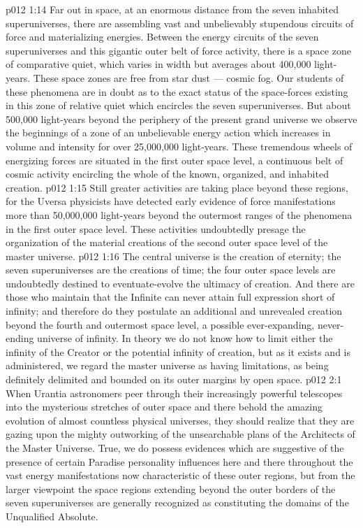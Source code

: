 \vs p012 1:14  Far out in space, at an enormous distance from the seven inhabited superuniverses, there are assembling vast and unbelievably stupendous circuits of force and materializing energies. Between the energy circuits of the seven superuniverses and this gigantic outer belt of force activity, there is a space zone of comparative quiet, which varies in width but averages about 400,000 light\hyp{}years. These space zones are free from star dust --- cosmic fog. Our students of these phenomena are in doubt as to the exact status of the space\hyp{}forces existing in this zone of relative quiet which encircles the seven superuniverses. But about 500,000 light\hyp{}years beyond the periphery of the present grand universe we observe the beginnings of a zone of an unbelievable energy action which increases in volume and intensity for over 25,000,000 light\hyp{}years. These tremendous wheels of energizing forces are situated in the first outer space level, a continuous belt of cosmic activity encircling the whole of the known, organized, and inhabited creation.
\vs p012 1:15 Still greater activities are taking place beyond these regions, for the Uversa physicists have detected early evidence of force manifestations more than 50,000,000 light\hyp{}years beyond the outermost ranges of the phenomena in the first outer space level. These activities undoubtedly presage the organization of the material creations of the second outer space level of the master universe.
\vs p012 1:16 The central universe is the creation of eternity; the seven superuniverses are the creations of time; the four outer space levels are undoubtedly destined to eventuate\hyp{}evolve the ultimacy of creation. And there are those who maintain that the Infinite can never attain full expression short of infinity; and therefore do they postulate an additional and unrevealed creation beyond the fourth and outermost space level, a possible ever\hyp{}expanding, never\hyp{}ending universe of infinity. In theory we do not know how to limit either the infinity of the Creator or the potential infinity of creation, but as it exists and is administered, we regard the master universe as having limitations, as being definitely delimited and bounded on its outer margins by open space.
\vs p012 2:1 When Urantia astronomers peer through their increasingly powerful telescopes into the mysterious stretches of outer space and there behold the amazing evolution of almost countless physical universes, they should realize that they are gazing upon the mighty outworking of the unsearchable plans of the Architects of the Master Universe. True, we do possess evidences which are suggestive of the presence of certain Paradise personality influences here and there throughout the vast energy manifestations now characteristic of these outer regions, but from the larger viewpoint the space regions extending beyond the outer borders of the seven superuniverses are generally recognized as constituting the domains of the Unqualified Absolute.
